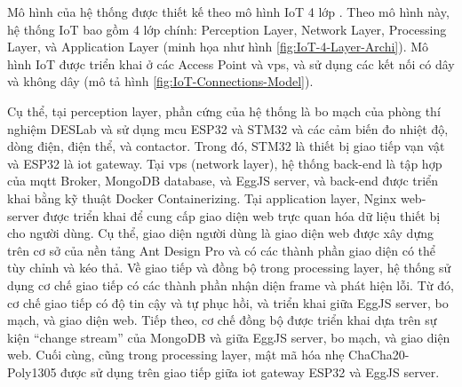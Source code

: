 Mô hình của hệ thống được thiết kế theo mô hình IoT 4 lớp \cite{IoT-4-Layer-Archi}. Theo mô hình này, hệ thống IoT bao gồm 4 lớp chính: Perception Layer, Network Layer, Processing Layer, và Application Layer (minh họa như hình \ref{fig:IoT-4-Layer-Archi}). Mô hình IoT được triển khai ở các Access Point và \acrshort{vps}, và sử dụng các kết nối có dây và không dây (mô tả hình \ref{fig:IoT-Connections-Model}).

Cụ thể, tại perception layer, phần cứng của hệ thống là bo mạch của phòng thí nghiệm DESLab và sử dụng \acrshort{mcu} ESP32 và STM32 và các cảm biến đo nhiệt độ, dòng điện, điện thể, và contactor. Trong đó, STM32 là thiết bị giao tiếp vạn vật và ESP32 là \acrshort{iot} gateway.
% 
Tại \acrshort{vps} (network layer), hệ thống back-end là tập hợp của \acrfull{mqtt} Broker, MongoDB database, và EggJS server, và back-end được triển khai bằng kỹ thuật Docker Containerizing. Tại application layer, Nginx web-server được triển khai để cung cấp giao diện web trực quan hóa dữ liệu thiết bị cho người dùng.
%
Cụ thể, giao diện người dùng là giao diện web được xây dựng trên cơ sở của nền tảng Ant Design Pro và có các thành phần giao diện có thể tùy chỉnh và kéo thả.
%
Về giao tiếp và đồng bộ trong processing layer, hệ thống sử dụng cơ chế giao tiếp có các thành phần nhận diện frame và phát hiện lỗi. Từ đó, cơ chế giao tiếp có độ tin cậy và tự phục hồi, và triển khai giữa EggJS server, bo mạch, và giao diện web.
%
Tiếp theo, cơ chế đồng bộ được triển khai dựa trên sự kiện ``change stream'' của MongoDB và giữa EggJS server, bo mạch, và giao diện web.
%
Cuối cùng, cũng trong processing layer, mật mã hóa nhẹ ChaCha20-Poly1305 được sử dụng trên giao tiếp giữa \acrshort{iot} gateway ESP32 và EggJS server.

